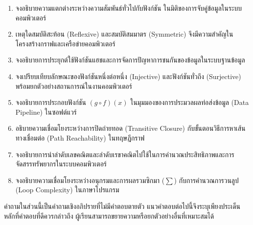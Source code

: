 \newpage
\QAChapter
\begin{enumerate}
    \item จงอธิบายความแตกต่างระหว่างความสัมพันธ์ทั่วไปกับฟังก์ชัน ในมิติของการจับคู่ข้อมูลในระบบคอมพิวเตอร์
    \item เหตุใดสมบัติสะท้อน (Reflexive) และสมบัติสมมาตร (Symmetric) จึงมีความสำคัญในโครงสร้างกราฟและเครือข่ายคอมพิวเตอร์
    \item จงอธิบายการประยุกต์ใช้ฟังก์ชันแฮชและการจัดการปัญหาการชนกันของข้อมูลในระบบฐานข้อมูล
    \item จงเปรียบเทียบลักษณะของฟังก์ชันหนึ่งต่อหนึ่ง (Injective) และฟังก์ชันทั่วถึง (Surjective) พร้อมยกตัวอย่างสถานการณ์ในงานคอมพิวเตอร์
    \item จงอธิบายการประกอบฟังก์ชัน $(g \circ f)(x)$ ในมุมมองของการประมวลผลท่อส่งข้อมูล (Data Pipeline) ในซอฟต์แวร์
    \item อธิบายความเชื่อมโยงระหว่างการปิดถ่ายทอด (Transitive Closure) กับขั้นตอนวิธีการหาเส้นทางเชื่อมต่อ (Path Reachability) ในทฤษฎีกราฟ
    \item จงอธิบายการนำลำดับเลขคณิตและลำดับเรขาคณิตไปใช้ในการคำนวณประสิทธิภาพและการจัดสรรทรัพยากรในระบบคอมพิวเตอร์
    \item จงอธิบายความเชื่อมโยงระหว่างอนุกรมและการผลรวมซิกมา ($\sum$) กับการคำนวณการวนลูป (Loop Complexity) ในภาษาโปรแกรม
\end{enumerate}

คำถามในส่วนนี้เป็นคำถามเชิงอภิปรายที่ไม่มีคำตอบตายตัว แนวคำตอบต่อไปนี้จึงระบุเพียงประเด็นหลักที่คำตอบที่ดีควรกล่าวถึง ผู้เรียนสามารถขยายความหรือยกตัวอย่างอื่นที่เหมาะสมได้

